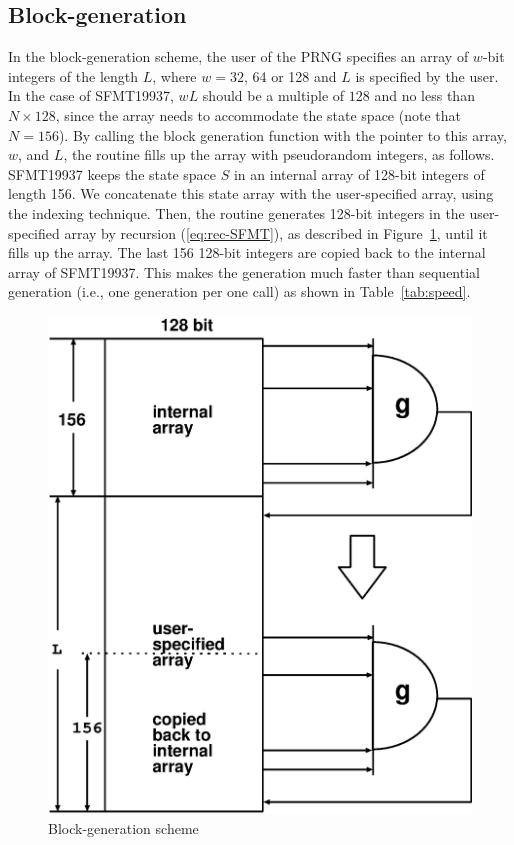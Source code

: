 \documentclass{svmult}
\begin{document}
\subsection{Block-generation}\label{sec:block}
In the block-generation scheme, 
the user of the PRNG specifies an array
of $w$-bit integers of the length $L$, 
where $w=32$, 64 or 128 and $L$ is specified
by the user.
In the case of SFMT19937,
$wL$ should be a multiple of $128$
and no less than $N \times 128$,
since the array needs to accommodate the state space
(note that $N=156$).
By calling the block generation function 
with the pointer to this array, $w$, and $L$, 
the routine fills up the array with
pseudorandom integers, as follows. SFMT19937 keeps the state
space $S$ in an internal array of 128-bit integers of length 156.
We concatenate this state array with the user-specified array, 
using the indexing technique.
Then, the routine generates 128-bit integers in the user-specified 
array by recursion (\ref{eq:rec-SFMT}), as described
in Figure~\ref{fig:B1}, until it fills up the array.
The last 156 128-bit integers
are copied back to the internal array
of SFMT19937. 
This makes the generation much faster than sequential generation
(i.e., one generation per one call) as shown in Table~\ref{tab:speed}.
\begin{figure}
\begin{center}
\includegraphics[width=0.7\linewidth,height=0.36\textheight,
keepaspectratio]{fill_array.eps}
\end{center}
\caption{Block-generation scheme}
\label{fig:B1}
\end{figure}
\end{document}
